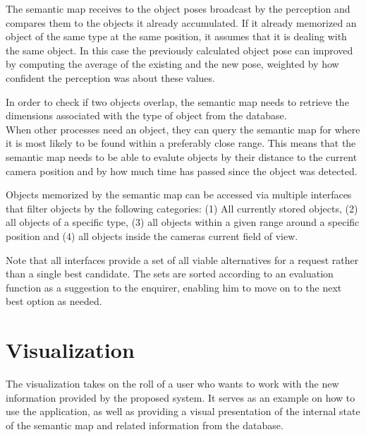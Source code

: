 The semantic map receives to the object poses broadcast by the perception and compares them to the objects it already accumulated. If it already memorized an object of the same type at the same position, it assumes that it is dealing with the same object. In this case the previously calculated object pose can improved by computing the average of the existing and the new pose, weighted by how confident the perception was about these values.

In order to check if two objects overlap, the semantic map needs to retrieve the dimensions associated with the type of object from the database. \\

When other processes need an object, they can query the semantic map for where it is most likely to be found within a preferably close range. This means that the semantic map needs to be able to evalute objects by their distance to the current camera position and by how much time has passed since the object was detected.

Objects memorized by the semantic map can be accessed via multiple interfaces that filter objects by the following categories: (1) All currently stored objects, (2) all objects of a specific type, (3) all objects within a given range around a specific position and (4) all objects inside the cameras current field of view.

Note that all interfaces provide a set of all viable alternatives for a request rather than a single best candidate. The sets are sorted according to an evaluation function as a suggestion to the enquirer, enabling him to move on to the next best option as needed.

\section{Visualization}
\label{sec:arch-viz}
The visualization takes on the roll of a user who wants to work with the new information provided by the proposed system. It serves as an example on how to use the application, as well as providing a visual presentation of the internal state of the semantic map and related information from the database.


